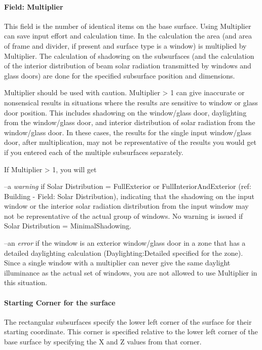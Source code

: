 \paragraph{Field: Multiplier}\label{field-multiplier-6}

This field is the number of identical items on the base surface. Using Multiplier can save input effort and calculation time. In the calculation the area (and area of frame and divider, if present and surface type is a window) is multiplied by Multiplier. The calculation of shadowing on the subsurfaces (and the calculation of the interior distribution of beam solar radiation transmitted by windows and glass doors) are done for the specified subsurface position and dimensions.

Multiplier should be used with caution. Multiplier \textgreater{} 1 can give inaccurate or nonsensical results in situations where the results are sensitive to window or glass door position. This includes shadowing on the window/glass door, daylighting from the window/glass door, and interior distribution of solar radiation from the window/glass door. In these cases, the results for the single input window/glass door, after multiplication, may not be representative of the results you would get if you entered each of the multiple subsurfaces separately.

If Multiplier \textgreater{} 1, you will get

--a \emph{warning} if Solar Distribution = FullExterior or FullInteriorAndExterior (ref: Building - Field: Solar Distribution), indicating that the shadowing on the input window or the interior solar radiation distribution from the input window may not be representative of the actual group of windows. No warning is issued if Solar Distribution = MinimalShadowing.

--an \emph{error} if the window is an exterior window/glass door in a zone that has a detailed daylighting calculation (Daylighting:Detailed specified for the zone). Since a single window with a multiplier can never give the same daylight illuminance as the actual set of windows, you are not allowed to use Multiplier in this situation.

\paragraph{Starting Corner for the surface}\label{starting-corner-for-the-surface-15}

The rectangular subsurfaces specify the lower left corner of the surface for their starting coordinate. This corner is specified relative to the lower left corner of the base surface by specifying the X and Z values from that corner.

